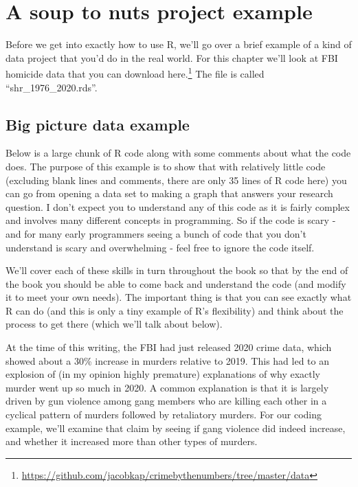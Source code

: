 \documentclass[
]{krantz}
\renewcommand{\href}[2]{#2\footnote{\url{#1}}}
\begin{document}
\hypertarget{a-soup-to-nuts-project-example}{%
\chapter{A soup to nuts project
example}\label{a-soup-to-nuts-project-example}}

Before we get into exactly how to use R, we'll go over a
brief example of a kind of data project that you'd do in the
real world. For this chapter we'll look at FBI homicide data
that you can download
\href{https://github.com/jacobkap/crimebythenumbers/tree/master/data}{here.}
The file is called ``shr\_1976\_2020.rds''.

\hypertarget{big-picture-data-example}{%
\section{Big picture data
example}\label{big-picture-data-example}}

Below is a large chunk of R code along with some comments
about what the code does. The purpose of this example is to
show that with relatively little code (excluding blank lines
and comments, there are only 35 lines of R code here) you
can go from opening a data set to making a graph that
answers your research question. I don't expect you to
understand any of this code as it is fairly complex and
involves many different concepts in programming. So if the
code is scary - and for many early programmers seeing a
bunch of code that you don't understand is scary and
overwhelming - feel free to ignore the code itself.

We'll cover each of these skills in turn throughout the book
so that by the end of the book you should be able to come
back and understand the code (and modify it to meet your own
needs). The important thing is that you can see exactly what
R can do (and this is only a tiny example of R's
flexibility) and think about the process to get there (which
we'll talk about below).

At the time of this writing, the FBI had just released 2020
crime data, which showed about a 30\% increase in murders
relative to 2019. This had led to an explosion of (in my
opinion highly premature) explanations of why exactly murder
went up so much in 2020. A common explanation is that it is
largely driven by gun violence among gang members who are
killing each other in a cyclical pattern of murders followed
by retaliatory murders. For our coding example, we'll
examine that claim by seeing if gang violence did indeed
increase, and whether it increased more than other types of
murders.
\end{document}
